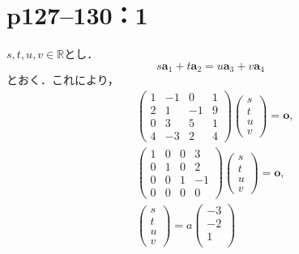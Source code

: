 \documentclass[a4paper,10pt,fleqn]{ltjsarticle}
\begin{document}
\section*{p127--130：1}

\begin{tleftbar}
    $s,t,u,v \in \mathbb{R}$とし．
    \[
        s\bm{a}_1+t\bm{a}_2=u\bm{a}_3+v\bm{a}_4
    \]
    とおく．これにより，
    \begin{align*}
         &
        \begin{pmatrix}
            1 & -1 & 0  & 1 \\
            2 & 1  & -1 & 9 \\
            0 & 3  & 5  & 1 \\
            4 & -3 & 2  & 4
        \end{pmatrix}
        \begin{pmatrix}
            s \\
            t \\
            u \\
            v
        \end{pmatrix}
        =\bm{o} , \\
         &
        \begin{pmatrix}
            1 & 0 & 0 & 3  \\
            0 & 1 & 0 & 2  \\
            0 & 0 & 1 & -1 \\
            0 & 0 & 0 & 0
        \end{pmatrix}
        \begin{pmatrix}
            s \\
            t \\
            u \\
            v
        \end{pmatrix}
        =\bm{o} , \\
         &
        \begin{pmatrix}
            s \\
            t \\
            u \\
            v
        \end{pmatrix}
        =a
        \begin{pmatrix}
            -3 \\
            -2 \\
            1  \\

\end{pmatrix}
\end{align*}
\end{tleftbar}
\end{document}
